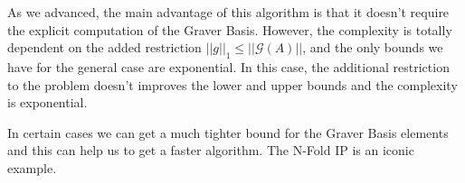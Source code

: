 
As we advanced, the main advantage of this algorithm is that it doesn't require the explicit computation of the Graver Basis. However, the complexity is totally dependent on the added restriction $||g||_1 \leq ||\mathcal{G}(A)||$, and the only bounds we have for the general case are exponential. In this case, the additional restriction to the problem doesn't improves the lower and upper bounds and the complexity is exponential. 

In certain cases we can get a much tighter bound for the Graver Basis elements and this can help us to get a faster algorithm. The N-Fold IP is an iconic example. 